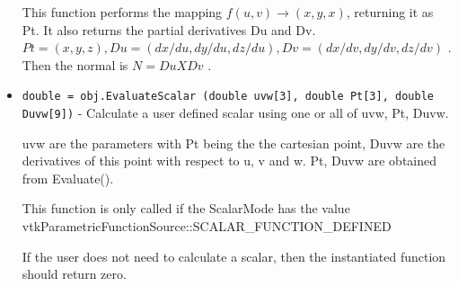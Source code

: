 \begin{itemize}
 This function performs the mapping $f(u,v) \rightarrow (x,y,x)$, returning it
 as Pt. It also returns the partial derivatives Du and Dv.
 $Pt = (x, y, z), Du = (dx/du, dy/du, dz/du), Dv = (dx/dv, dy/dv, dz/dv)$ .
 Then the normal is $N = Du X Dv$ .

\item  \verb|double = obj.EvaluateScalar (double uvw[3], double Pt[3], double Duvw[9])| -  Calculate a user defined scalar using one or all of uvw, Pt, Duvw.

 uvw are the parameters with Pt being the the cartesian point, 
 Duvw are the derivatives of this point with respect to u, v and w.
 Pt, Duvw are obtained from Evaluate().

 This function is only called if the ScalarMode has the value
 vtkParametricFunctionSource::SCALAR\_FUNCTION\_DEFINED

 If the user does not need to calculate a scalar, then the 
 instantiated function should return zero. 

\end{itemize}

